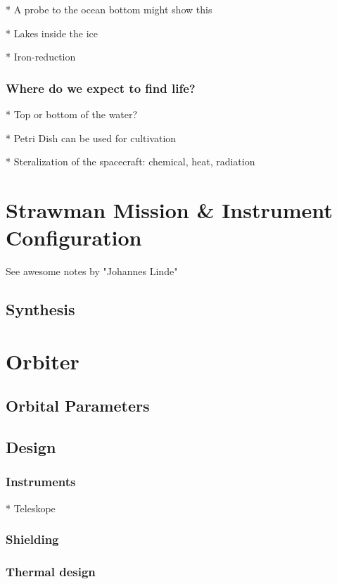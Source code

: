 \documentclass{book}
\begin{document}
    * A probe to the ocean bottom might show this
    
* Lakes inside the ice

* Iron-reduction

\subsubsection{Where do we expect to find life?}

* Top or bottom of the water?

* Petri Dish can be used for cultivation

* Steralization of the spacecraft: chemical, heat, radiation

\section{\textbf{Strawman Mission \& Instrument Configuration}} %

See awesome notes by "Johannes Linde"

\subsection{Synthesis}

\section{Orbiter}


\subsection{Orbital Parameters}


\subsection{Design}

\subsubsection{Instruments}

* Teleskope

\subsubsection{Shielding}

\subsubsection{Thermal design}
\end{document}
